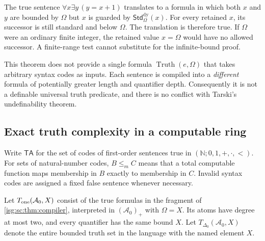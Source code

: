 \documentclass[11pt]{article}
\theoremstyle{definition}
\theoremstyle{remark}
\newcommand{\N}{\mathbb{N}}
\newcommand{\StdDy}{\mathsf{Std}^{\mathrm{dy}}}
\newcommand{\TA}{\mathsf{TA}}
\newcommand{\Asc}{\mathcal{A}}
\begin{document}
\begin{example}\label{isg:sc:ex:bound}
The true sentence $\forall x\exists y\,(y=x+1)$ translates to a formula in
which both $x$ and $y$ are bounded by $\Omega$ but $x$ is guarded by
$\StdDy_\Omega(x)$. For every retained $x$, its successor is still
standard and below $\Omega$. The translation is therefore true. If
$\Omega$ were an ordinary finite integer, the retained value $x=\Omega$
would have no allowed successor. A finite-range test cannot substitute for
the infinite-bound proof.
\end{example}

This theorem does not provide a single formula
$\operatorname{Truth}(e,\Omega)$ that takes arbitrary syntax codes as
inputs. Each sentence is compiled into a \emph{different} formula of
potentially greater length and quantifier depth. Consequently it is not a
definable universal truth predicate, and there is no conflict with
Tarski's undefinability theorem.

\subsection{Exact truth complexity in a computable ring}\label{isg:sc:sec:complexity}
Write $\TA$ for the set of codes of first-order sentences true in
$(\N;0,1,+,\cdot,<)$. For sets of natural-number codes, $B\le_mC$ means
that a total computable function maps membership in $B$ exactly to
membership in $C$. Invalid syntax codes are assigned a fixed false sentence
whenever necessary.

Let $T_{\rm one}(\Asc_0,X)$ consist of the true formulas in the fragment
of \cref{isg:sc:thm:compiler}, interpreted in $(\Asc_0)_+$ with
$\Omega=X$. Its atoms have degree at most two, and every quantifier has the
same bound $X$. Let $T_{\Delta_0}(\Asc_0,X)$ denote the entire bounded
truth set in the language with the named element $X$.
\end{document}

